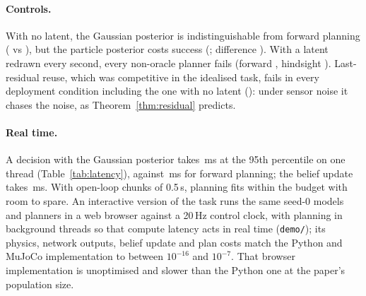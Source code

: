 \documentclass[11pt]{article}
\begin{document}
\paragraph{Controls.} With no latent, the Gaussian posterior is indistinguishable from forward planning (\dpHindNone{}
vs \dpFwdNone), but the particle posterior costs success (\dpPfNone; difference \dpPfDiffNone). With a latent redrawn
every second, every non-oracle planner fails (forward \dpFwdFresh, hindsight \dpHindFresh). Last-residual reuse, which
was competitive in the idealised task, fails in every deployment condition including the one with no latent
(\dpResidNone): under sensor noise it chases the noise, as Theorem~\ref{thm:residual} predicts.

\begin{table}[t]\centering\small

\caption{Decision and belief-update latency for one robot, one CPU thread (\latCPU), production configuration
(300 candidate plans, 3 CEM iterations, horizon 15, five-member ensemble).}
\label{tab:latency}
\end{table}

\paragraph{Real time.} A decision with the Gaussian posterior takes \latPostOne\,ms at the 95th percentile on one thread
(Table~\ref{tab:latency}), against \latFwdOne\,ms for forward planning; the belief update takes \latObsPost\,ms. With
open-loop chunks of 0.5\,s, planning fits within the budget with room to spare. An interactive version of the task runs
the same seed-0 models and planners in a web browser against a 20\,Hz control clock, with planning in background threads
so that compute latency acts in real time (\texttt{demo/}); its physics, network outputs, belief update and plan costs
match the Python and MuJoCo implementation to between $10^{-16}$ and $10^{-7}$. That browser implementation is
unoptimised and slower than the Python one at the paper's population size.


\end{document}
